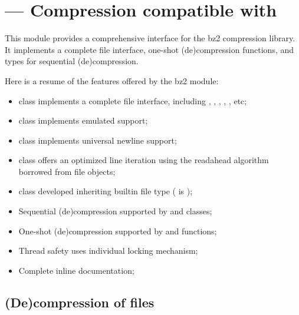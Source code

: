 \section{ ---
         Compression compatible with }



This module provides a comprehensive interface for the bz2 compression library.
It implements a complete file interface, one-shot (de)compression functions,
and types for sequential (de)compression.

Here is a resume of the features offered by the bz2 module:

\begin{itemize}
\item {} class implements a complete file interface, including
      , , ,
      , , etc;
\item {} class implements emulated  support;
\item {} class implements universal newline support;
\item {} class offers an optimized line iteration using
      the readahead algorithm borrowed from file objects;
\item {} class developed inheriting builtin file type
      ( is );
\item Sequential (de)compression supported by  and
       classes;
\item One-shot (de)compression supported by  and
       functions;
\item Thread safety uses individual locking mechanism;
\item Complete inline documentation;
\end{itemize}


\subsection{(De)compression of files}

